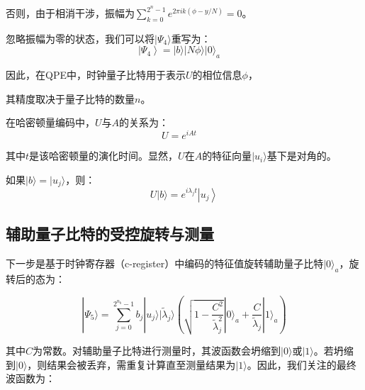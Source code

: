 \documentclass{article}
\begin{document}
否则，由于相消干涉，振幅为$\sum_{k=0}^{2^{n}-1} e^{2 \pi i k(\phi - y/N)}=0$。

忽略振幅为零的状态，我们可以将$|\Psi_{4}\rangle$重写为：
\[
\left|\Psi_{4}\right>=|b\rangle|N \phi\rangle|0\rangle_{a} \quad
\]

因此，在QPE中，时钟量子比特用于表示$U$的相位信息$\phi$，

其精度取决于量子比特的数量$n$。

在哈密顿量编码中，$U$与$A$的关系为：
\[
U=e^{i A t} \quad
\]

其中$t$是该哈密顿量的演化时间。显然，$U$在$A$的特征向量$|u_{i}\rangle$基下是对角的。

如果$|b\rangle = |u_{j}\rangle$，则：
\[
U|b\rangle=e^{i \lambda_{j} t}\left|u_{j}\right\rangle
\]




\subsection{辅助量子比特的受控旋转与测量}

下一步是基于时钟寄存器（c-register）中编码的特征值旋转辅助量子比特\(|0\rangle_a\)，旋转后的态为：

\[
|\Psi_5\rangle = \sum_{j=0}^{2^{n_b}-1} b_j |u_j\rangle |\tilde{\lambda}_j\rangle \left( \sqrt{1 - \frac{C^2}{\tilde{\lambda}_j^2}} |0\rangle_a + \frac{C}{\tilde{\lambda}_j} |1\rangle_a \right)
\]

其中\(C\)为常数。对辅助量子比特进行测量时，其波函数会坍缩到\(|0\rangle\)或\(|1\rangle\)。若坍缩到\(|0\rangle\)，则结果会被丢弃，需重复计算直至测量结果为\(|1\rangle\)。因此，我们关注的最终波函数为：
\end{document}
